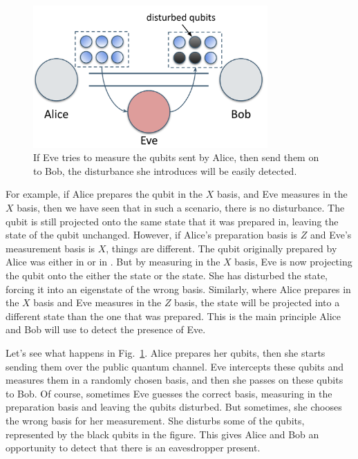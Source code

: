 \begin{figure}[H]
    \centering
    \includegraphics[width=0.8\textwidth]{lesson9/eve-disturbance.png}
        \caption[Eve's measurements disturb the qubits]{If Eve tries to measure  the qubits sent by Alice, then send them on to Bob, the disturbance she introduces will be easily detected.}
    \label{fig:eve-disturbance}
\end{figure}

For example, if Alice prepares the qubit in the $X$ basis, and Eve measures in the $X$ basis, then we have seen that in such a scenario, there is no disturbance. The qubit is still projected onto the same state that it was prepared in, leaving the state of the qubit unchanged. However, if Alice's preparation basis is $Z$ and Eve's measurement basis is $X$, things are different. The qubit originally prepared by Alice was either in  or in .  But by measuring in the $X$ basis, Eve is now projecting the qubit onto the either the \ket{+} state or the \ket{-} state. She has disturbed the state, forcing it into an eigenstate of the wrong basis. Similarly, where Alice prepares in the $X$ basis and Eve measures in the $Z$ basis, the state will be projected into a different state than the one that was prepared. This is the main principle Alice and Bob will use to detect the presence of Eve.


Let's see what happens in Fig.~\ref{fig:eve-disturbance}. Alice prepares her qubits, then she starts sending them over the public quantum channel. Eve intercepts these qubits and measures them in a randomly chosen basis, and then she passes on these qubits to Bob. Of course, sometimes Eve guesses the correct basis, measuring in the preparation basis and leaving the qubits disturbed. But sometimes, she chooses the wrong basis for her measurement. She disturbs some of the qubits, represented by the black qubits in the figure. This gives Alice and Bob an opportunity to detect that there is an eavesdropper present.

